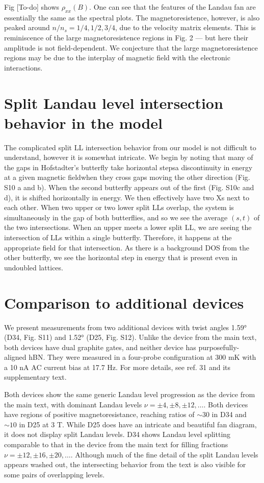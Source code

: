 \documentclass[12pt,twocolumn]{article}
\begin{document}
Fig [To-do] shows $\rho_{xx}(B)$. One can see that the features of the Landau fan are essentially the same as the spectral plots. The magnetoresistence, however, is also peaked around $n/n_s = 1/4,1/2,3/4$, due to the velocity matrix elements. This is reminiscence of the large magnetoresistence regions in Fig. 2 --- but here their amplitude is not field-dependent. We conjecture that the large magnetoresistence regions may be due to the interplay of magnetic field with the electronic interactions.  


\section{Split Landau level intersection behavior in the model}
The complicated split LL intersection behavior from our model is not difficult to understand, however it is somewhat intricate. We begin by noting that many of the gaps in Hofstadter’s butterfly take horizontal steps\textemdash a discontinuity in energy at a given magnetic field\textemdash when they cross gaps moving the other direction (Fig. S10 a and b). When the second butterfly appears out of the first (Fig. S10c and d), it is shifted horizontally in energy. We then effectively have two Xs next to each other. When two upper or two lower split LLs overlap, the system is simultaneously in the gap of both butterflies, and so we see the average $(s, t)$ of the two intersections. When an upper meets a lower split LL, we are seeing the intersection of LLs within a single butterfly. Therefore, it happens at the appropriate field for that intersection. As there is a background DOS from the other butterfly, we see the horizontal step in energy that is present even in undoubled lattices.

\section{Comparison to additional devices}
We present measurements from two additional devices with twist angles 1.59° (D34, Fig. S11) and 1.52° (D25, Fig. S12). Unlike the device from the main text, both devices have dual graphite gates, and neither device has purposefully-aligned hBN. They were measured in a four-probe configuration at 300 mK with a 10 nA AC current bias at 17.7 Hz. For more details, see ref. 31 and its supplementary text.

Both devices show the same generic Landau level progression as the device from the main text, with dominant Landau levels $\nu = \pm 4, \pm 8, \pm 12, …$. Both devices have regions of  positive magnetoresistance, reaching ratios of $\sim 30$ in D34 and $\sim 10$ in D25 at 3 T. While D25 does have an intricate and beautiful fan diagram, it does not display split Landau levels. D34 shows Landau level splitting comparable to that in the device from the main text for filling fractions $\nu = \pm 12, \pm 16, \pm 20, …$. Although much of the fine detail of the split Landau levels appears washed out, the intersecting behavior from the text is also visible for some pairs of overlapping levels.
\end{document}
